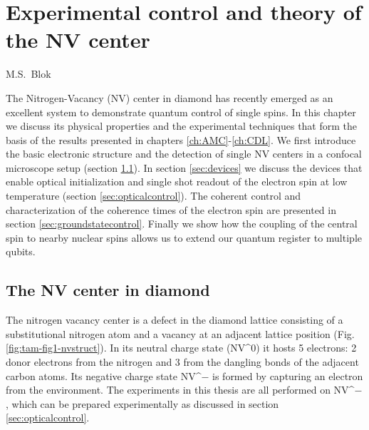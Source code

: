 \graphicspath{{./ch_theory_and_methods/figures/}}


\chapter{Experimental control and theory of the NV center}
\label{ch:TAM}

\begin{center} 
    \vspace{-1cm} {M.S.~Blok} 
\end{center}


\vspace{-0.5cm} 
The Nitrogen-Vacancy (NV) center in diamond has recently emerged as an excellent system to demonstrate quantum control of single spins. In this chapter we discuss its physical properties and the experimental techniques that form the basis of the results presented in chapters \ref{ch:AMC}-\ref{ch:CDL}. We first introduce the basic electronic structure and the detection of single NV centers in a confocal microscope setup (section \ref{sec:NVcenter}). In section \ref{sec:devices} we discuss the devices that enable optical initialization and single shot readout of the electron spin at low temperature (section \ref{sec:opticalcontrol}). The coherent control and characterization of the coherence times of the electron spin are presented in section \ref{sec:groundstatecontrol}. Finally we show how the coupling of the central spin to nearby nuclear spins allows us to extend our quantum register to multiple qubits.
\clearpage


\section{The NV center in diamond}
\label{sec:NVcenter}

The nitrogen vacancy center is a defect in the diamond lattice consisting of a substitutional nitrogen atom and a vacancy at an adjacent lattice position (Fig. \ref{fig:tam-fig1-nvstruct}). In its neutral charge state (NV^${0}$) it hosts 5 electrons: 2 donor electrons from the nitrogen and 3 from the dangling bonds of the adjacent carbon atoms. Its negative charge state NV^${-}$ is formed by capturing an electron from the environment. The experiments in this thesis are all performed on NV^${-}$, which can be prepared experimentally as discussed in section \ref{sec:opticalcontrol}.

